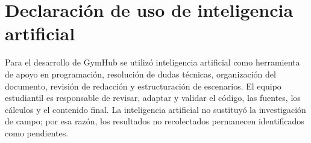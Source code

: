 \section{Declaración de uso de inteligencia artificial}

Para el desarrollo de GymHub se utilizó inteligencia artificial como herramienta
de apoyo en programación, resolución de dudas técnicas, organización del
documento, revisión de redacción y estructuración de escenarios. El equipo
estudiantil es responsable de revisar, adaptar y validar el código, las fuentes,
los cálculos y el contenido final. La inteligencia artificial no sustituyó la
investigación de campo; por esa razón, los resultados no recolectados permanecen
identificados como pendientes.

